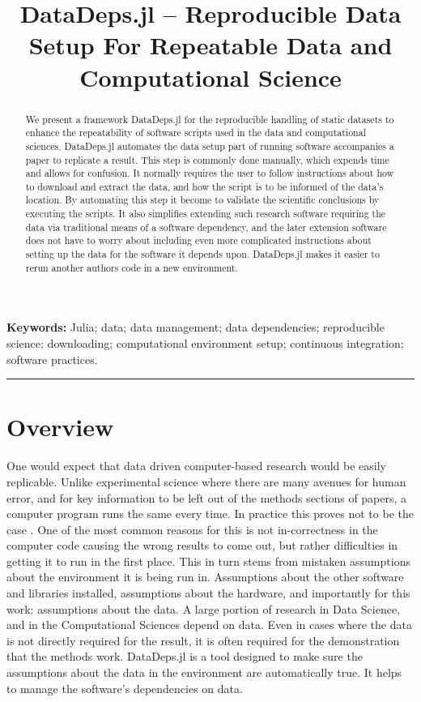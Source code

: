 \documentclass{jors}
\title{{DataDeps.jl -- Reproducible Data Setup For Repeatable Data and Computational Science}}
\author{}
\begin{document}
\maketitle

\begin{abstract}
We present a framework DataDeps.jl for the reproducible handling of static datasets to enhance the repeatability of software scripts used in the data and computational sciences.
DataDeps.jl automates the data setup part of running software accompanies a paper to replicate a result.
This step is commonly done manually, which expends time and allows for confusion.
It normally requires the user to follow instructions about how to download and extract the data, and how the script is to be informed of the data's location.
By automating this step it become to validate the scientific conclusions by executing the scripts.
It also simplifies extending such research software requiring the data via traditional means of a software dependency, and the later extension software does not have to worry about including even more complicated instructions about setting up the data for the software it depends upon.
DataDeps.jl makes it easier to rerun another authors code in a new environment.
\end{abstract}

\textbf{Keywords:} Julia; data; data management;  data dependencies; reproducible science; downloading; computational environment setup; continuous integration; software practices.


\rule{\textwidth}{1pt}


\section{Overview}


One would expect that data driven computer-based research would be easily replicable.
Unlike experimental science where there are many avenues for human error, and for key information to be left out of the methods sections of papers, a computer program runs the same every time.
In practice this proves not to be the case .
One of the most common reasons for this is not in-correctness in the computer code causing the wrong results to come out,
but rather difficulties in getting it to run in the first place.
This in turn stems from mistaken assumptions about the environment it is being run in.
Assumptions about the other software and libraries installed, assumptions about the hardware,
and importantly for this work: assumptions about the data.
A large portion of research in Data Science, and in the Computational Sciences depend on data.
Even in cases where the data is not directly required for the result, it is often required for the demonstration that the methods work.
DataDeps.jl is a tool designed to make sure the assumptions about the data in the environment are automatically true.
It helps to manage the software's dependencies on data.
\end{document}

